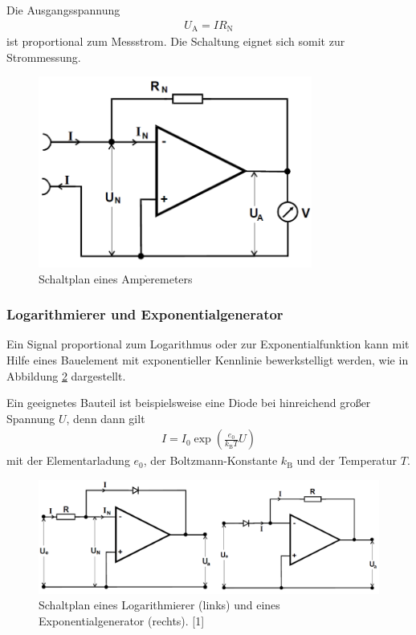 Die Ausgangsspannung 
\begin{align}
U_\text{A}=IR_\text{N}
\end{align}
ist proportional zum Messstrom. Die Schaltung eignet sich somit zur Strommessung.
\begin{figure}[H]
\centering
\includegraphics[width=9cm]{images/schaltplan_amperemeter.png}
\caption{Schaltplan eines Amp$\grave{\text{e}}$remeters}
\label{fig:schaltplan_amperemeter}
\end{figure} 












\subsubsection{Logarithmierer und Exponentialgenerator}
Ein Signal proportional zum Logarithmus oder zur Exponentialfunktion kann mit Hilfe eines Bauelement mit exponentieller Kennlinie bewerkstelligt werden, wie in Abbildung \ref{fig:schalplan_explog} dargestellt.

Ein geeignetes Bauteil ist beispielsweise eine Diode bei hinreichend großer Spannung $U$, denn dann gilt
\begin{align}
I=I_0 \exp \left(\frac{e_0}{k_\text{B} T}U\right)
\end{align}
mit der Elementarladung $e_0$, der Boltzmann-Konstante $k_\text{B}$ und der Temperatur $T$. 


\begin{figure}[H]
\centering
\includegraphics[width=15cm]{images/schaltplan_explog.png}
\caption{Schaltplan eines Logarithmierer (links) und eines Exponentialgenerator (rechts). [1]}
\label{fig:schalplan_explog}
\end{figure}

